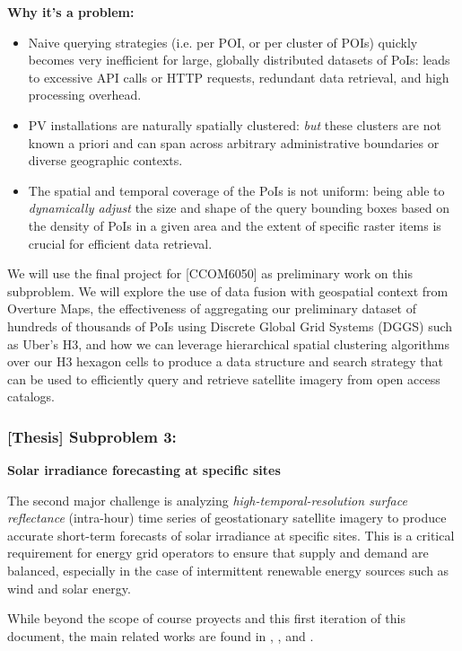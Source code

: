     \textbf{Why it's a problem:} 
    \begin{itemize}
        \item Naive querying strategies (i.e. per POI, or per cluster of POIs) quickly becomes very inefficient for large, globally distributed datasets of PoIs: 
        leads to excessive API calls or HTTP requests, redundant data retrieval, and high processing overhead.
        \item PV installations are naturally spatially clustered: \textit{but} these clusters are not known a priori and can span across arbitrary administrative boundaries or diverse geographic contexts.
        \item The spatial and temporal coverage of the PoIs is not uniform: being able to \textit{dynamically adjust} the size and shape of the query bounding boxes based on the density of PoIs in a given area and the extent of specific raster items is crucial for efficient data retrieval.
    \end{itemize}

    We will use the final project for [CCOM6050] as preliminary work on this subproblem. We will explore the use of data fusion with geospatial context from Overture Maps, the effectiveness of aggregating our 
    preliminary dataset of hundreds of thousands of PoIs using Discrete Global Grid Systems (DGGS) such as Uber's H3, and how we can leverage hierarchical spatial clustering algorithms over our H3 hexagon cells to 
    produce a data structure and search strategy that can be used to efficiently query and retrieve satellite imagery from open access catalogs.  

\subsubsection{[Thesis] Subproblem 3:} 
    \textbf{Solar irradiance forecasting at specific sites} 

    The second major challenge is analyzing \textit{high-temporal-resolution surface reflectance} (intra-hour) time series of geostationary satellite imagery to produce accurate short-term forecasts of solar irradiance at specific sites. 
    This is a critical requirement for energy grid operators to ensure that supply and demand are balanced, especially in the case of intermittent renewable energy sources such as wind and solar energy. 

    While beyond the scope of course proyects and this first iteration of this document, the main related works are found in \cite{Bansal_ssl_nowcasting_2022}, \cite{Li_solarcube_solar_forecasting_2024}, and \cite{Boussif_neurips_day_ahead_solar_forecasting_2023}. 
    \hfill